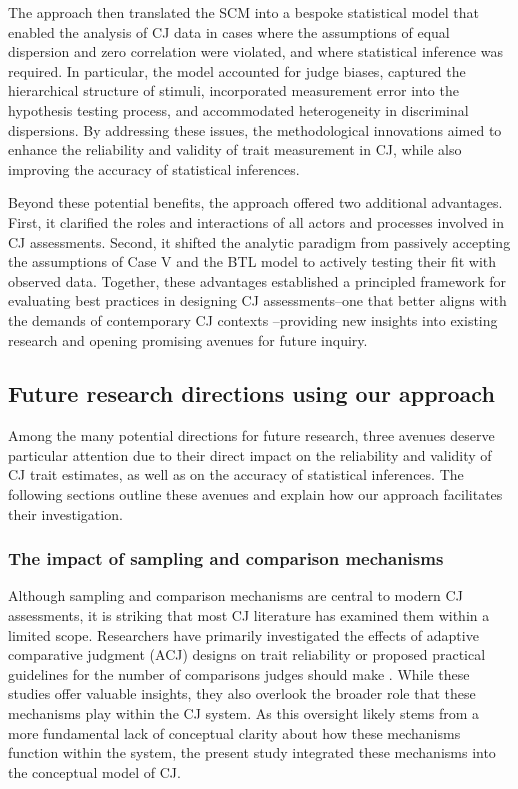 \documentclass[
  authoryear,
  review,
  1p]{elsarticle}
\begin{document}
The approach then translated the SCM into a bespoke statistical model
that enabled the analysis of CJ data in cases where the assumptions of
equal dispersion and zero correlation were violated, and where
statistical inference was required. In particular, the model accounted
for judge biases, captured the hierarchical structure of stimuli,
incorporated measurement error into the hypothesis testing process, and
accommodated heterogeneity in discriminal dispersions. By addressing
these issues, the methodological innovations aimed to enhance the
reliability and validity of trait measurement in CJ, while also
improving the accuracy of statistical inferences.

Beyond these potential benefits, the approach offered two additional
advantages. First, it clarified the roles and interactions of all actors
and processes involved in CJ assessments. Second, it shifted the
analytic paradigm from passively accepting the assumptions of Case V and
the BTL model to actively testing their fit with observed data.
Together, these advantages established a principled framework for
evaluating best practices in designing CJ assessments--one that better
aligns with the demands of contemporary CJ contexts
\citep{Kelly_et_al_2022}--providing new insights into existing research
and opening promising avenues for future inquiry.

\subsection{Future research directions using our
approach}\label{sec-discussion_RA}

Among the many potential directions for future research, three avenues
deserve particular attention due to their direct impact on the
reliability and validity of CJ trait estimates, as well as on the
accuracy of statistical inferences. The following sections outline these
avenues and explain how our approach facilitates their investigation.

\subsubsection{The impact of sampling and comparison
mechanisms}\label{sec-discussion_RA1}

Although sampling and comparison mechanisms are central to modern CJ
assessments, it is striking that most CJ literature has examined them
within a limited scope. Researchers have primarily investigated the
effects of adaptive comparative judgment (ACJ) designs on trait
reliability
\citep{Pollitt_2012a, Pollitt_2012b, Bramley_2015, Verhavert_et_al_2022, Mikhailiuk_et_al_2021, Gray_et_al_2024}
or proposed practical guidelines for the number of comparisons judges
should make \citep{Verhavert_et_al_2019, Crompvoets_et_al_2022}. While
these studies offer valuable insights, they also overlook the broader
role that these mechanisms play within the CJ system. As this oversight
likely stems from a more fundamental lack of conceptual clarity about
how these mechanisms function within the system, the present study
integrated these mechanisms into the conceptual model of CJ.
\end{document}
